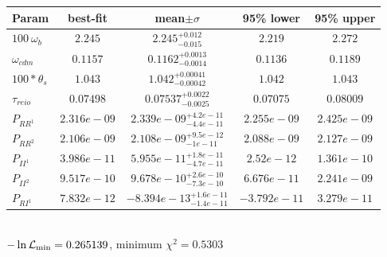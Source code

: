 \begin{tabular}{|l|c|c|c|c|} 
 \hline 
Param & best-fit & mean$\pm\sigma$ & 95\% lower & 95\% upper \\ \hline 
$100~\omega_{b }$ &$2.245$ & $2.245_{-0.015}^{+0.012}$ & $2.219$ & $2.272$ \\ 
$\omega_{cdm }$ &$0.1157$ & $0.1162_{-0.0014}^{+0.0013}$ & $0.1136$ & $0.1189$ \\ 
$100*\theta_{s }$ &$1.043$ & $1.042_{-0.00042}^{+0.00041}$ & $1.042$ & $1.043$ \\ 
$\tau_{reio }$ &$0.07498$ & $0.07537_{-0.0025}^{+0.0022}$ & $0.07075$ & $0.08009$ \\ 
$P_{{RR}^1 }$ &$2.316e-09$ & $2.339e-09_{-4.4e-11}^{+4.2e-11}$ & $2.255e-09$ & $2.425e-09$ \\ 
$P_{{RR}^2 }$ &$2.106e-09$ & $2.108e-09_{-1e-11}^{+9.5e-12}$ & $2.088e-09$ & $2.127e-09$ \\ 
$P_{{II}^1 }$ &$3.986e-11$ & $5.955e-11_{-4.7e-11}^{+1.8e-11}$ & $2.52e-12$ & $1.361e-10$ \\ 
$P_{{II}^2 }$ &$9.517e-10$ & $9.678e-10_{-7.3e-10}^{+2.6e-10}$ & $6.676e-11$ & $2.241e-09$ \\ 
$P_{{RI}^1 }$ &$7.832e-12$ & $-8.394e-13_{-1.4e-11}^{+1.6e-11}$ & $-3.792e-11$ & $3.279e-11$ \\ 
\hline 
 \end{tabular} \\ 
$-\ln{\cal L}_\mathrm{min} =0.265139$, minimum $\chi^2=0.5303$ \\ 
